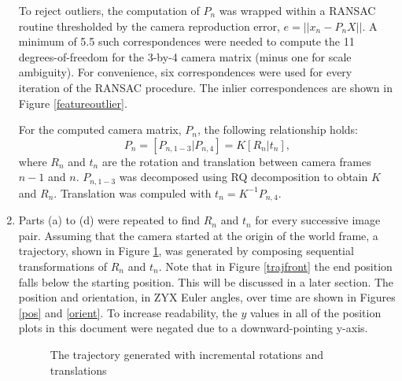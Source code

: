 \documentclass[letter, 10pt]{article}
\begin{document}
\begin{onehalfspacing}
\begin{enumerate}[leftmargin=2em,label={\alph*)}]
To reject outliers, the computation of $P_n$ was wrapped within a RANSAC routine thresholded by the camera reproduction error, $e = || x_n - P_nX ||$. A minimum of 5.5 such correspondences were needed to compute the 11 degrees-of-freedom for the 3-by-4 camera matrix (minus one for scale ambiguity). For convenience, six correspondences were used for every iteration of the RANSAC procedure. The inlier correspondences are shown in Figure \ref{featureoutlier}.

For the computed camera matrix, $P_n$, the following relationship holds:
\begin{equation}
	P_n = [P_{n, 1-3} | P_{n, 4}]= K[R_n | t_n],
\end{equation}
where $R_n$ and $t_n$ are the rotation and translation between camera frames $n-1$ and $n$. $P_{n, 1-3}$ was decomposed using RQ decomposition to obtain $K$ and $R_n$. Translation was compuled with $t_n = K^{-1}P_{n, 4}$.

\item %
Parts (a) to (d) were repeated to find $R_n$ and $t_n$ for every successive image pair. Assuming that the camera started at the origin of the world frame, a trajectory, shown in Figure \ref{traj}, was generated by composing sequential transformations of $R_n$ and $t_n$. Note that in Figure \ref{trajfront} the end position falls below the starting position. This will be discussed in a later section. The position and orientation, in ZYX Euler angles, over time are shown in Figures \ref{pos} and \ref{orient}. To increase readability, the $y$ values in all of the position plots in this document were negated due to a downward-pointing y-axis.

\begin{figure}[t]
	\centering
	\caption{The trajectory generated with incremental rotations and translations}
	\label{traj}
\end{figure}


\end{enumerate}
\end{onehalfspacing}
\end{document}
